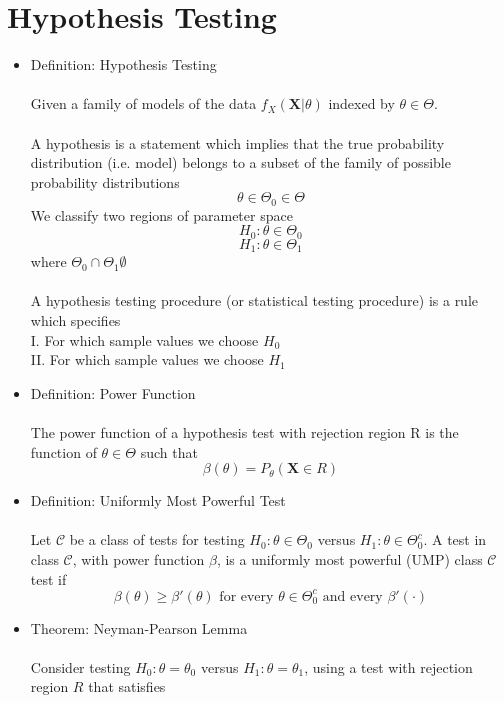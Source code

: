 \documentclass{article}
\begin{document}
\section{Hypothesis Testing}
\begin{itemize}
    \item Definition: Hypothesis Testing\\\\
    Given a family of models of the data $f_X(\textbf{X}|\theta)$ indexed by $\theta\in\Theta$.\\\\
    A hypothesis is a statement which implies that the true probability distribution (i.e. model) belongs to a subset of  the family of possible probability distributions\\
    $$\theta\in\Theta_0\in\Theta$$
    We classify two regions of parameter space\\
    $$H_0: \theta\in\Theta_0$$
    $$H_1: \theta\in\Theta_1$$
    where $\Theta_0\cap\Theta_1\emptyset$\\\\
    A hypothesis testing procedure (or statistical testing procedure) is a rule which specifies\\
    I. For which sample values we choose $H_0$\\
    II. For which sample values we choose $H_1$
    \item Definition: Power Function\\\\
    The power function of a hypothesis test with rejection region R is the function of $\theta\in\Theta$ such that\\
    $$\beta(\theta)=P_\theta(\textbf{X}\in R)$$
    \item Definition: Uniformly Most Powerful Test\\\\
    Let $\mathcal{C}$ be a class of tests for testing $H_0:\theta\in\Theta_0$ versus $H_1:\theta\in\Theta_0^c$.  A test in class $\mathcal{C}$, with power function $\beta$, is a uniformly most powerful (UMP) class $\mathcal{C}$ test if\\
    $$\beta(\theta)\geq\beta'(\theta)\text{ for every }\theta\in\Theta_0^c\text{ and every }\beta'(\cdot)$$
    \item Theorem: Neyman-Pearson Lemma\\\\
    Consider testing $H_0:\theta=\theta_0$ versus $H_1:\theta=\theta_1$, using a test with rejection region $R$ that satisfies\\

\end{itemize}
\end{document}

